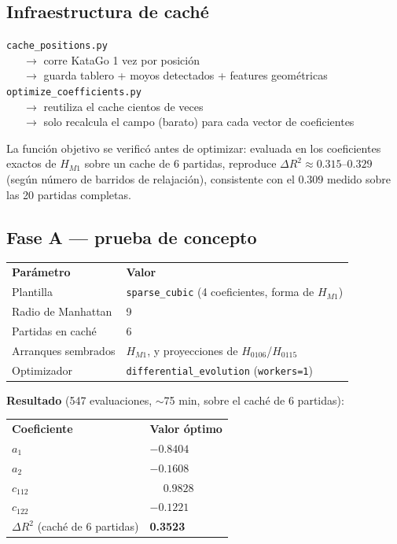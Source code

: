 \documentclass[11pt, a4paper]{article}
\newcommand{\TH}[1]{\cellcolor{cTHbg}\color{white}\textbf{#1}}
\newcommand{\good}[1]{\color{cGood}\textbf{#1}}
\begin{document}
\subsection{Infraestructura de cach\'e}

\begin{tcolorbox}[codebox]
\texttt{cache\_positions.py} \\
\ \ \ $\to$ corre KataGo 1 vez por posici\'on \\
\ \ \ $\to$ guarda tablero + moyos detectados + features geom\'etricas \\[4pt]
\texttt{optimize\_coefficients.py} \\
\ \ \ $\to$ reutiliza el cache cientos de veces \\
\ \ \ $\to$ solo recalcula el campo (barato) para cada vector de coeficientes
\end{tcolorbox}

La funci\'on objetivo se verific\'o antes de optimizar: evaluada en los
coeficientes exactos de $H_{M1}$ sobre un cache de 6 partidas, reproduce
$\Delta R^2 \approx 0.315$--$0.329$ (seg\'un n\'umero de barridos de
relajaci\'on), consistente con el $0.309$ medido sobre las 20 partidas
completas.

\subsection{Fase A --- prueba de concepto}

\begin{center}
\begin{tabular}{ll}
  \TH{Par\'ametro} & \TH{Valor} \\[1pt]
  Plantilla & \texttt{sparse\_cubic} (4 coeficientes, forma de $H_{M1}$) \\
  Radio de Manhattan & 9 \\
  Partidas en cach\'e & 6 \\
  Arranques sembrados & $H_{M1}$, y proyecciones de $H_{0106}$/$H_{0115}$ \\
  Optimizador & \texttt{differential\_evolution} (\texttt{workers=1}) \\
\end{tabular}
\end{center}

\textbf{Resultado} (547 evaluaciones, $\sim$75 min, sobre el cach\'e
de 6 partidas):

\medskip
\begin{center}
\begin{tabular}{ll}
  \TH{Coeficiente} & \TH{Valor \'optimo} \\[1pt]
  $a_1$    & $-0.8404$ \\
  $a_2$    & $-0.1608$ \\
  $c_{112}$ & $\phantom{-}0.9828$ \\
  $c_{122}$ & $-0.1221$ \\
  $\Delta R^2$ (cach\'e de 6 partidas) & \good{0.3523} \\
\end{tabular}
\end{center}
\medskip
\end{document}
